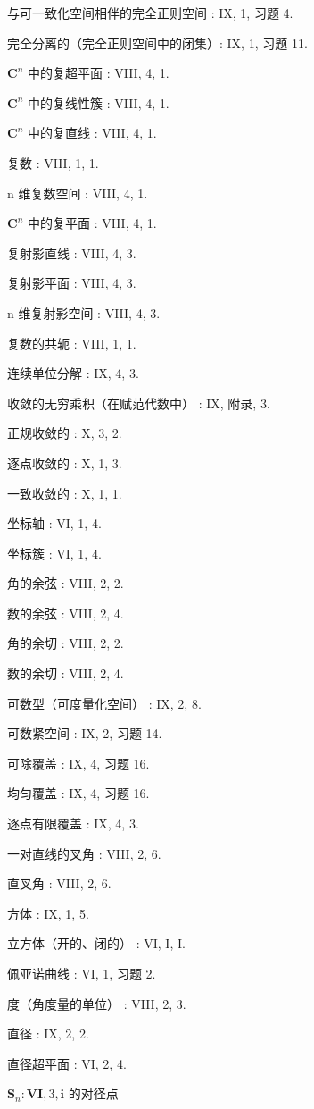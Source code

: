 与可一致化空间相伴的完全正则空间 : IX, 1, 习题 4.

完全分离的（完全正则空间中的闭集）: IX, 1, 习题 11.

\(\mathbf{C}^n\) 中的复超平面 : VIII, 4, 1.

\(\mathbf{C}^n\) 中的复线性簇 : VIII, 4, 1.

\(\mathbf{C}^n\) 中的复直线 : VIII, 4, 1.

复数 : VIII, 1, 1.

n 维复数空间 : VIII, 4, 1.

\(\mathbf{C}^n\) 中的复平面 : VIII, 4, 1.

复射影直线 : VIII, 4, 3.

复射影平面 : VIII, 4, 3.

n 维复射影空间 : VIII, 4, 3.

复数的共轭 : VIII, 1, 1.

连续单位分解 : IX, 4, 3.

收敛的无穷乘积（在赋范代数中） : IX, 附录, 3.

正规收敛的 : X, 3, 2.

逐点收敛的 : X, 1, 3.

一致收敛的 : X, 1, 1.

坐标轴 : VI, 1, 4.

坐标簇 : VI, 1, 4.

角的余弦 : VIII, 2, 2.

数的余弦 : VIII, 2, 4.

角的余切 : VIII, 2, 2.

数的余切 : VIII, 2, 4.

可数型（可度量化空间） : IX, 2, 8.

可数紧空间 : IX, 2, 习题 14.

可除覆盖 : IX, 4, 习题 16.

均匀覆盖 : IX, 4, 习题 16.

逐点有限覆盖 : IX, 4, 3.

一对直线的叉角 : VIII, 2, 6.

直叉角 : VIII, 2, 6.

方体 : IX, 1, 5.

立方体（开的、闭的） : VI, I, I.

佩亚诺曲线 : VI, 1, 习题 2.

度（角度量的单位） : VIII, 2, 3.

直径 : IX, 2, 2.

直径超平面 : VI, 2, 4.

\(\mathbf{S}_n:\mathbf{VI},3,\mathbf{i}\) 的对径点

